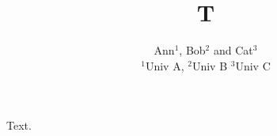 \documentclass{article}
\title{T}
\author{Ann$^{1}$, Bob$^{2}$ and Cat$^{3}$ \\ {\small $^1$Univ A, $^2$Univ B} \color{blue} $^3$Univ C}
\begin{document}
\maketitle
Text.
\end{document}
